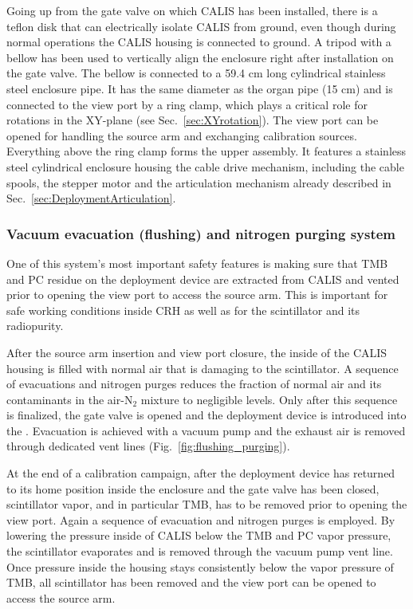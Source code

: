 Going up from the gate valve on which CALIS has been installed, there is a teflon disk that can electrically isolate CALIS from ground, even though during normal operations the CALIS housing is connected to ground. A tripod with a bellow has been used to vertically align the enclosure right after installation on the gate valve. The bellow is connected to a 59.4 cm long cylindrical stainless steel enclosure pipe. It has the same diameter as the organ pipe (15 cm) and is connected to the view port by a ring clamp, which plays a critical role for rotations in the XY-plane (see Sec.~\ref{sec:XYrotation}). The view port can be opened for handling the source arm and exchanging calibration sources. Everything above the ring clamp forms the upper assembly. It features a stainless steel cylindrical enclosure housing the cable drive mechanism, including the cable spools, the stepper motor and the articulation mechanism already described in Sec.~\ref{sec:DeploymentArticulation}. 

\subsubsection*{Vacuum evacuation (flushing) and nitrogen purging system}\label{sec:EvacPurge}
One of this system's most important safety features is making sure that TMB and PC residue on the deployment device are extracted from CALIS and vented prior to opening the view port to access the source arm. This is important for safe working conditions inside CRH as well as for the scintillator and its radiopurity. 

After the source arm insertion and view port closure, the inside of the CALIS housing is filled with normal air that is damaging to the scintillator. A sequence of evacuations and nitrogen purges reduces the fraction of normal air and its contaminants in the air-N$_2$ mixture to negligible levels. Only after this sequence is finalized, the gate valve is opened and the deployment device is introduced into the \lsv. Evacuation is achieved with a vacuum pump and the exhaust air is removed through dedicated vent lines (Fig.~\ref{fig:flushing_purging}).

At the end of a calibration campaign, after the deployment device has returned to its home position inside the enclosure and the gate valve has been closed, scintillator vapor, and in particular TMB, has to be removed prior to opening the view port. Again a sequence of evacuation and nitrogen purges is employed. By lowering the pressure inside of CALIS below the TMB and PC vapor pressure, the scintillator evaporates and is removed through the vacuum pump vent line. Once pressure inside the housing stays consistently below the vapor pressure of TMB, all scintillator has been removed and the view port can be opened to access the source arm.
 
